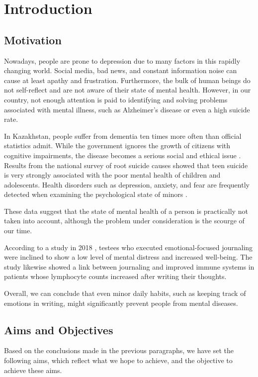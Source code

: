 \chapter{Introduction}\label{ch:intro}
\section{Motivation}
Nowadays, people are prone to depression due to many factors in this rapidly changing world. Social media, bad news, and constant information noise can cause at least apathy and frustration. Furthermore, the bulk of human beings do not self-reflect and are not aware of their state of mental health. However, in our country, not enough attention is paid to identifying and solving problems associated with mental illness, such as Alzheimer's disease or even a high suicide rate.

In Kazakhstan, people suffer from dementia ten times more often than official statistics admit. While the government ignores the growth of citizens with cognitive impairments, the disease becomes a serious social and ethical issue \cite{kz-dementia}. Results from the national survey of root suicide causes showed that teen suicide is very strongly associated with the poor mental health of children and adolescents. Health disorders such as depression, anxiety, and fear are frequently detected when examining the psychological state of minors \cite{postcovid-suicide}.

These data suggest that the state of mental health of a person is practically not taken into account, although the problem under consideration is the scourge of our time.

According to a study in 2018 \cite{gbd-results}, testees who executed emotional-focused journaling were inclined to show a low level of mental distress and increased well-being. The study likewise showed a link between journaling and improved immune systems in patients whose lymphocyte counts increased after writing their thoughts.

Overall, we can conclude that even minor daily habits, such as keeping track of emotions in writing, might significantly prevent people from mental diseases.

\section{Aims and Objectives}
Based on the conclusions made in the previous paragraphs, we have set the following aims, which reflect what we hope to achieve, and the objective to achieve these aims.

